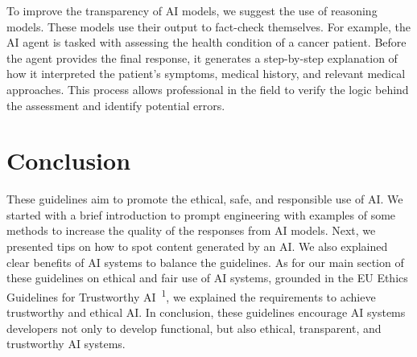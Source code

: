 To improve the transparency of AI models, we suggest the use of reasoning models. These models use their output to fact-check themselves. For example, the AI agent is tasked with assessing the health condition of a cancer patient. Before the agent provides the final response, it generates a step-by-step explanation of how it interpreted the patient’s symptoms, medical history, and relevant medical approaches. This process allows professional in the field to verify the logic behind the assessment and identify potential errors.


\section{Conclusion}
These guidelines aim to promote the ethical, safe, and responsible use of AI. We started with a brief introduction to prompt engineering with examples of some methods to increase the quality of the responses from AI models. Next, we presented tips on how to spot content generated by an AI. We also explained clear benefits of AI systems to balance the guidelines. As for our main section of these guidelines on ethical and fair use of AI systems, grounded in the EU Ethics Guidelines for Trustworthy AI~\textsuperscript{1}, we explained the requirements to achieve trustworthy and ethical AI. 
In conclusion, these guidelines encourage AI systems developers not only to develop functional, but also ethical, transparent, and trustworthy AI systems.


